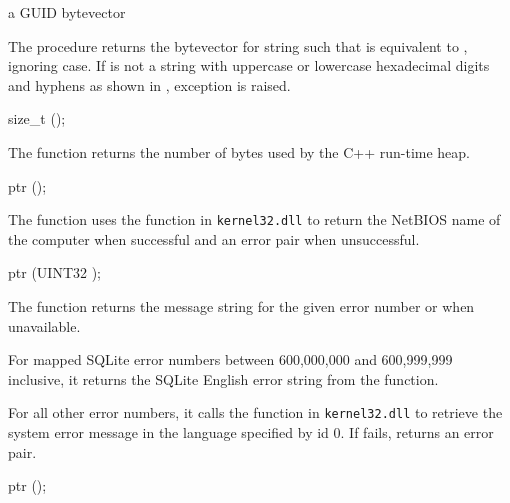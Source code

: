 \begin{procedure}
\end{procedure}
\returns{} a GUID bytevector

The  procedure returns the bytevector 
for string  such that  is
equivalent to , ignoring case. If  is not a string with
uppercase or lowercase hexadecimal digits and hyphens as shown in
, exception  is raised.

\begin{function}
  size\_t ();
\end{function}\antipar

The  function returns the number of bytes
used by the C++ run-time heap.

\begin{function}
  ptr ();
\end{function}\antipar

The  function uses the
 function in \texttt{kernel32.dll} to return
the NetBIOS name of the computer when successful and an error pair
when unsuccessful.

\begin{function}
  ptr (UINT32 );
\end{function}\antipar

The  function returns the message string
for the given error number or  when unavailable.

For mapped SQLite error numbers between 600,000,000 and 600,999,999
inclusive, it returns the SQLite English error string from the
 function.

For all other error numbers, it calls the 
function in \texttt{kernel32.dll} to retrieve the system error message
in the language specified by id 0. If  fails,
 returns an error pair.

\begin{function}
  ptr ();
\end{function}\antipar

